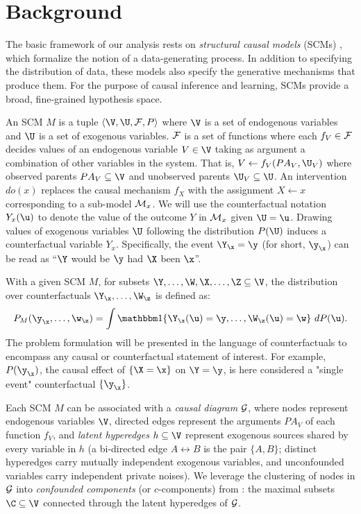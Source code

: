 \section{Background}
\label{sec:setup}

The basic framework of our analysis rests on \textit{structural causal models} (SCMs) \citep[Def. 7.1.1]{pearl2009causality}, which formalize the notion of a data-generating process. In addition to specifying the distribution of data, these models also specify the generative mechanisms that produce them. For the purpose of causal inference and learning, SCMs provide a broad, fine-grained hypothesis space.

An SCM $M$ is a tuple $\langle \V, \U, \1F, P \rangle$ where $\V$ is a set of endogenous variables and $\U$ is a set of exogenous variables. $\mathcal{F}$ is a set of functions where each $f_V \in \mathcal{F}$ decides values of an endogenous variable $V \in \V$ taking as argument a combination of other variables in the system. That is, $V \leftarrow f_{V}(PA_V, \U_V)$ where observed parents $PA_V \subseteq \V$ and unobserved parents $\U_V \subseteq \U$. An intervention $do(x)$ replaces the causal mechanism $f_{X}$ with the assignment $X \leftarrow x$ corresponding to a sub-model $\mathcal{M}_x$. We will use the counterfactual notation $Y_x(\u)$ to denote the value of the outcome $Y$ in $\mathcal{M}_x$ given $\U=\u$. Drawing values of exogenous variables $\U$ following the distribution $P(\U)$ induces a counterfactual variable $Y_x$. Specifically, the event $\Y_\x = \y$ (for short, $\y_\x$) can be read as ``$\Y$ would be $\y$ had $\X$ been $\x$''.

With a given SCM $M$, for subsets $\Y, \dots ,\W, \X, \dots, \Z \subseteq \V$, the distribution over counterfactuals $\Y_\x, \dots ,\W_\z$ is defined as:
\begin{equation}
  \label{eq:counterfactual_probability}
  P_M(\y_\x, \dots,  \w_\z) = \int \I\{\Y_\x(\u) = \y, \dots,  \W_\z(\u) = \w \} \ dP(\u).
\end{equation}
The problem formulation will be presented in the language of counterfactuals to encompass any causal or counterfactual statement of interest. For example, $P(\y_\x)$, the causal effect of $\{\X=\x\}$ on $\Y=\y$, is here considered a "single event" counterfactual $\{\y_\x\}$.

Each SCM $M$ can be associated with a \textit{causal diagram} $\mathcal{G}$, where nodes represent endogenous variables $\V$, directed edges represent the arguments $PA_V$ of each function $f_{V}$, and \emph{latent hyperedges} $h\subseteq\V$ represent exogenous sources shared by every variable in $h$ (a bi-directed edge $A\leftrightarrow B$ is the pair $\{A,B\}$; distinct hyperedges carry mutually independent exogenous variables, and unconfounded variables carry independent private noises). We leverage the clustering of nodes in $\mathcal{G}$ into \emph{confounded components} (or $c$-components) from \citep{tian2002general}: the maximal subsets $\C \subseteq \V$ connected through the latent hyperedges of $\mathcal{G}$.
  
